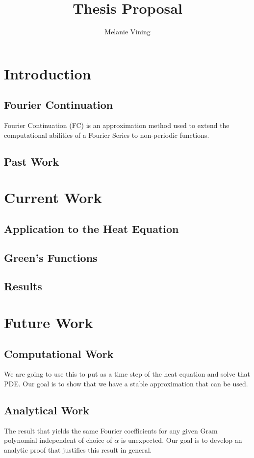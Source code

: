 \documentclass[11pt]{amsart}
\title{Thesis Proposal}
\author{Melanie Vining}
\begin{document}
\maketitle
\section{Introduction}
\subsection{Fourier Continuation}
Fourier Continuation (FC) is an approximation method used to extend the computational abilities of a Fourier Series to non-periodic functions.  
\subsection{Past Work}
\section{Current Work}
\subsection{Application to the Heat Equation}
\subsection{Green's Functions}
\subsection{Results}
\section{Future Work}
\subsection{Computational Work}
We are going to use this to put as a time step of the heat equation and solve that PDE.  Our goal is to show that we have a stable approximation that can be used. 
\subsection{Analytical Work}
The result that yields the same Fourier coefficients for any given Gram polynomial independent of choice of $\alpha$ is unexpected.  Our goal is to develop an analytic proof that justifies this result in general. 
\end{document}
